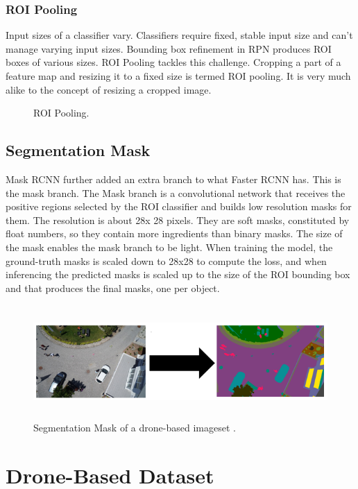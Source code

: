 {\subsubsection{ROI Pooling}

Input sizes of a classifier vary. Classifiers require fixed, stable input size and can’t manage varying input sizes. 
Bounding box refinement in RPN produces ROI boxes of various sizes. ROI Pooling tackles this challenge.
%
Cropping a part of a feature map and resizing it to a fixed size is termed ROI pooling. It is very much alike to the concept of resizing a cropped image.
 
\begin{figure}[H] 
\centering
   \caption{ROI Pooling.}
\end{figure}

\subsection{Segmentation Mask}
Mask RCNN further added an extra branch to what Faster RCNN has. This is the mask branch. The Mask branch is a convolutional network that receives the positive regions selected by the ROI classifier and builds low resolution masks for them. The resolution is about 28x 28 pixels. They are soft masks, constituted by float numbers, so they contain more ingredients than binary masks. The size of the mask enables the mask branch to be light. When training the model, the ground-truth masks is scaled down to 28x28 to compute the loss, and when inferencing the predicted masks is scaled up to the size of the ROI bounding box and that produces the final masks, one per object.

\begin{figure}[H]
  \centering
    \includegraphics[height=1.7in]{images/mask.png}
     \caption{Segmentation Mask of a drone-based imageset .}
  \end{figure}

\section{Drone-Based Dataset}

}
